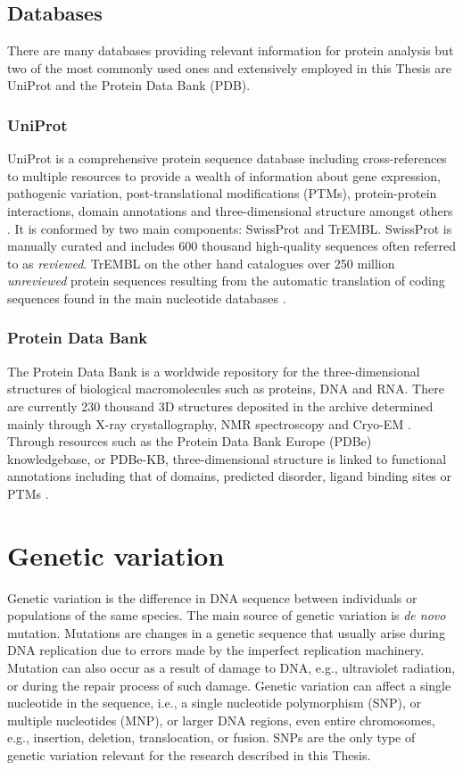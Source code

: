 \subsection{Databases}

There are many databases providing relevant information for protein analysis but two of the most commonly used ones and extensively employed in this Thesis are UniProt and the Protein Data Bank (PDB).

\subsubsection{UniProt}

UniProt is a comprehensive protein sequence database including cross-references to multiple resources to provide a wealth of information about gene expression, pathogenic variation, post-translational modifications (PTMs), protein-protein interactions, domain annotations and three-dimensional structure amongst others \cite{BAIROCH_2005_UNIPROT}. It is conformed by two main components: SwissProt and TrEMBL. SwissProt is manually curated and includes 600 thousand high-quality sequences often referred to as \textit{reviewed}. TrEMBL on the other hand catalogues over 250 million \textit{unreviewed} protein sequences resulting from the automatic translation of coding sequences found in the main nucleotide databases \cite{BAIROCH_2000_UNIPROT}.

\subsubsection{Protein Data Bank}

The Protein Data Bank is a worldwide repository for the three-dimensional structures of biological macromolecules such as proteins, DNA and RNA. There are currently 230 thousand 3D structures deposited in the archive determined mainly through X-ray crystallography, NMR spectroscopy and Cryo-EM \cite{BERMAN_2003_PDB}. Through resources such as the Protein Data Bank Europe (PDBe) knowledgebase, or PDBe-KB, three-dimensional structure is linked to functional annotations including that of domains, predicted disorder, ligand binding sites or PTMs \cite{PDBEKB_2019_PDBEKB}.

\section{Genetic variation}

Genetic variation is the difference in DNA sequence between individuals or populations of the same species. The main source of genetic variation is \textit{de novo} mutation. Mutations are changes in a genetic sequence that usually arise during DNA replication due to errors made by the imperfect replication machinery. Mutation can also occur as a result of damage to DNA, e.g., ultraviolet radiation, or during the repair process of such damage. Genetic variation can affect a single nucleotide in the sequence, i.e., a single nucleotide polymorphism (SNP), or multiple nucleotides (MNP), or larger DNA regions, even entire chromosomes, e.g., insertion, deletion, translocation, or fusion. SNPs are the only type of genetic variation relevant for the research described in this Thesis.

